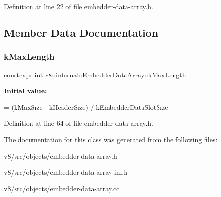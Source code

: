 Definition at line 22 of file embedder-\/data-\/array.\+h.



\subsection{Member Data Documentation}
\mbox{\label{classv8_1_1internal_1_1EmbedderDataArray_a50957fe62aef14abfc5e0015dc4263f0}} 
\subsubsection{\texorpdfstring{k\+Max\+Length}{kMaxLength}}
{\footnotesize\ttfamily constexpr \mbox{\hyperlink{classint}{int}} v8\+::internal\+::\+Embedder\+Data\+Array\+::k\+Max\+Length\hspace{0.3cm}{\ttfamily [static]}}

{\bfseries Initial value\+:}
\begin{DoxyCode}
=
      (kMaxSize - kHeaderSize) / kEmbedderDataSlotSize
\end{DoxyCode}


Definition at line 64 of file embedder-\/data-\/array.\+h.



The documentation for this class was generated from the following files\+:\begin{DoxyCompactItemize}
\item 
v8/src/objects/embedder-\/data-\/array.\+h\item 
v8/src/objects/embedder-\/data-\/array-\/inl.\+h\item 
v8/src/objects/embedder-\/data-\/array.\+cc\end{DoxyCompactItemize}
